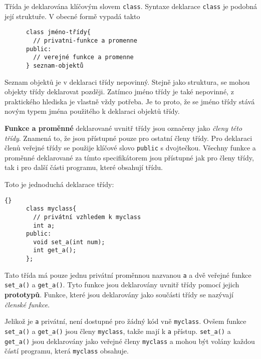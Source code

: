       Třída je deklarována klíčovým slovem \lstinline[basicstyle=\ttfamily]!class!. Syntaxe 
      deklarace \lstinline[basicstyle=\ttfamily]!class! je podobná její struktuře. V obecné formě 
      vypadá takto
  
      \lstset{numbers=none}
      \begin{lstlisting}
      class jméno-třídy{
        // privatni-funkce a promenne
      public:
        // verejné funkce a promenne
      } seznam-objektů
      \end{lstlisting}
      Seznam objektů je v deklaraci třídy nepovinný. Stejně jako struktura, se  mohou  objekty 
      třídy deklarovat později. Zatímco jméno třídy je také nepovinné, z praktického hlediska je 
      vlastně vždy potřeba. Je to proto, že se jméno třídy stává novým typem jména použitého k 
      deklaraci objektů třídy.
  
      \textbf{Funkce a proměnné} deklarované uvnitř třídy jsou označeny jako \textit{členy této 
      třídy}. Znamená to, že jsou přístupné pouze pro ostatní členy třídy. Pro deklaraci členů 
      veřejné třídy se použije klíčové slovo \lstinline[basicstyle=\ttfamily]!public! s dvojtečkou. 
      Všechny funkce a proměn\-né deklarované za tímto specifikátorem jsou přístupné jak pro členy 
      třídy, tak i pro další části programu, které obsahují třídu.
  
      Toto je jednoduchá deklarace třídy:
  
      \begin{lstlisting}{}
      class myclass{
        // privátní vzhledem k myclass
        int a;
      public:
        void set_a(int num);
        int get_a();
      };
      \end{lstlisting}
      Tato třída má pouze jednu privátní proměnnou nazvanou \lstinline[basicstyle=\ttfamily]!a! a 
      dvě veřejné funkce \lstinline[basicstyle=\ttfamily]!set_a()! a 
      \lstinline[basicstyle=\ttfamily]!get_a()!. Tyto funkce jsou deklarovány uvnitř třídy pomocí 
      jejich \textbf{prototypů}. Funkce, které jsou deklarovány jako součásti třídy se nazývají 
      \textit{členské funkce}.
  
      Jelikož je \lstinline[basicstyle=\ttfamily]!a! privátní, není dostupné pro žádný kód vně
      \lstinline[basicstyle=\ttfamily]!myclass!. Ovšem funkce 
      \lstinline[basicstyle=\ttfamily]!set_a()! a
      \lstinline[basicstyle=\ttfamily]!get_a()! jsou členy 
      \lstinline[basicstyle=\ttfamily]!myclass!, takže 
      mají k \lstinline[basicstyle=\ttfamily]!a! přístup. \lstinline[basicstyle=\ttfamily]!set_a()! 
      a
      \lstinline[basicstyle=\ttfamily]!get_a()! jsou deklarovány jako veřejné členy 
      \lstinline[basicstyle=\ttfamily]!myclass! a mohou být volány každou částí programu, která 
      \lstinline[basicstyle=\ttfamily]!myclass! obsahuje.
  
